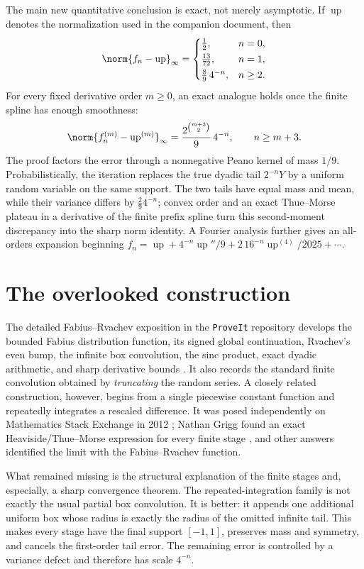 \documentclass[11pt,oneside]{article}
\theoremstyle{definition}
\theoremstyle{remark}
\newcommand{\Up}{\operatorname{up}}
\begin{document}
The main new quantitative conclusion is exact, not merely asymptotic.  If $\Up$ denotes the
normalization used in the companion document, then
\[
 \norm{f_n-\Up}_{\infty}=
 \begin{cases}
  \tfrac12,&n=0,\\[0.15em]
  \tfrac{13}{72},&n=1,\\[0.15em]
  \tfrac89\,4^{-n},&n\ge2.
 \end{cases}
\]
For every fixed derivative order $m\ge0$, an exact analogue holds once the finite spline has
enough smoothness:
\[
 \norm{f_n^{(m)}-\Up^{(m)}}_{\infty}
 =\frac{2^{\binom{m+3}{2}}}{9}\,4^{-n},\qquad n\ge m+3.
\]
The proof factors the error through a nonnegative Peano kernel of mass $1/9$.  Probabilistically,
the iteration replaces the true dyadic tail $2^{-n}Y$ by a uniform random variable on the same
support.  The two tails have equal mass and mean, while their variance differs by
$\frac{2}{9}4^{-n}$; convex order and an exact Thue--Morse plateau in a derivative of the finite
prefix spline turn this second-moment discrepancy into the sharp norm identity.  A Fourier
analysis further gives an all-orders expansion beginning
$f_n=\Up+4^{-n}\Up''/9+2\,16^{-n}\Up^{(4)}/2025+\cdots$.


\section{The overlooked construction}
\label{repeated:sec:introduction}

The detailed Fabius--Rvachev exposition in the \texttt{ProveIt} repository develops the
bounded Fabius distribution function, its signed global continuation, Rvachev's even bump,
the infinite box convolution, the sinc product, exact dyadic arithmetic, and sharp derivative
bounds \cite{repeated:companion,repeated:proveit}.  It also records the standard finite convolution obtained by
\emph{truncating} the random series.  A closely related construction, however, begins from a
single piecewise constant function and repeatedly integrates a rescaled difference.  It was
posed independently on Mathematics Stack Exchange in 2012 \cite{repeated:msequestion}; Nathan Grigg
found an exact Heaviside/Thue--Morse expression for every finite stage \cite{repeated:mseanswer}, and
other answers identified the limit with the Fabius--Rvachev function.

What remained missing is the structural explanation of the finite stages and, especially, a
sharp convergence theorem.  The repeated-integration family is not exactly the usual partial
box convolution.  It is better: it appends one additional uniform box whose radius is exactly
the radius of the omitted infinite tail.  This makes every stage have the final support
$[-1,1]$, preserves mass and symmetry, and cancels the first-order tail error.  The remaining
error is controlled by a variance defect and therefore has scale $4^{-n}$.
\end{document}

